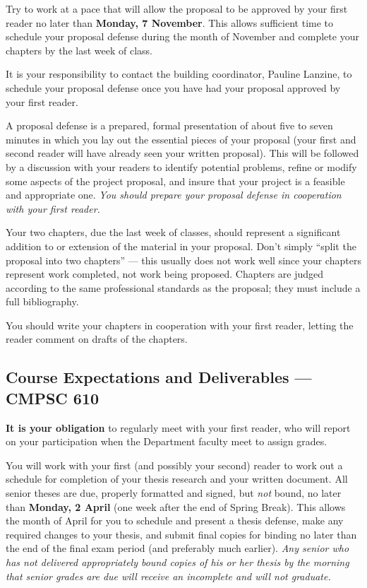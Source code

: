 Try to work at a pace that will allow the proposal to be approved by your 
first reader no later than {\bf Monday, 7 November}. 
This allows sufficient time to schedule your proposal defense during
the month of November and complete your chapters by the last week of class.

\medskip
{}
It is your responsibility to contact the building coordinator, Pauline
Lanzine, to schedule your proposal defense
once you have had your proposal approved by your first reader.

A proposal defense is a prepared, formal presentation of about five to
seven minutes in which you lay out the essential pieces of your proposal
(your first and second reader will have already seen your written
proposal). This will be followed by a discussion with your readers to
identify potential problems, refine or modify some aspects of the
project proposal, and insure that your project is a feasible and
appropriate one. {\em You should prepare your proposal defense in
cooperation with your first reader.}

\medskip
{} Your two chapters, due the last week 
of classes, should represent 
a significant addition to or extension of the material
in your proposal. Don't simply ``split the proposal into two chapters'' ---
this usually does not work well since
your chapters 
represent work completed, not work being proposed. Chapters are judged
according to the same professional standards as the proposal; they must
include a full bibliography.

You should write your chapters in cooperation with your first reader,
letting the reader comment on drafts of the chapters.

\subsection*{Course Expectations and Deliverables --- CMPSC 610}


\medskip
{}
{\bf It is your obligation} to regularly meet with your first reader,
who will report on your participation when the Department faculty
meet to assign grades.

\medskip
{}
You will work with your first (and possibly your second) reader to
work out a schedule for completion of your thesis research and your
written document. All senior theses are due, properly formatted and signed, 
but {\em not} bound, no later than {\bf Monday, 2 April} (one week after the end
of Spring Break). This allows the month of April for you to schedule  and
present a thesis defense, make any required changes to your thesis, and
submit final copies for binding no later than the end of the final
exam period (and preferably much earlier). {\em Any senior who has not 
delivered appropriately bound copies of his or her thesis by the morning
that senior grades are due will receive an incomplete and will not graduate.}

